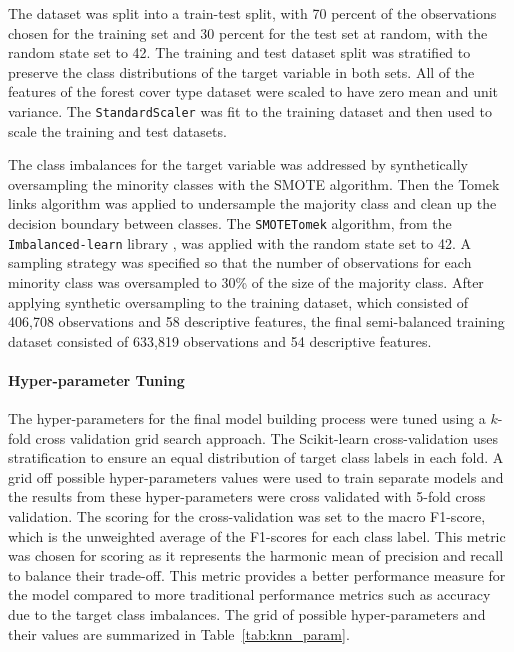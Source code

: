 \documentclass[conference]{IEEEtran}
\begin{document}
	The dataset was split into a train-test split, with 70 percent of the observations chosen for the training set and 30 percent for the test set at random, with the random state set to 42. The training and test dataset split was stratified to preserve the class distributions of the target variable in both sets. All of the features of the forest cover type dataset were scaled to have zero mean and unit variance. The \texttt{StandardScaler} was fit to the training dataset and then used to scale the training and test datasets. 
	
	The class imbalances for the target variable was addressed by synthetically oversampling the minority classes with the SMOTE algorithm. Then the Tomek links algorithm was applied to undersample the majority class and clean up the decision boundary between classes. The \texttt{SMOTETomek} algorithm, from the \texttt{Imbalanced-learn} library \cite{b5}, was applied with the random state set to 42. A sampling strategy was specified so that the number of observations for each minority class was oversampled to 30\% of the size of the majority class. After applying synthetic oversampling to the training dataset, which consisted of 406,708 observations and 58 descriptive features, the final semi-balanced training dataset consisted of 633,819 observations and 54 descriptive features.
	
	\paragraph{Hyper-parameter Tuning}
	The hyper-parameters for the final model building process were tuned using a $k$-fold cross validation grid search approach. The Scikit-learn cross-validation uses stratification to ensure an equal distribution of target class labels in each fold. A grid off possible hyper-parameters values were used to train separate models and the results from these hyper-parameters were cross validated with 5-fold cross validation. The scoring for the cross-validation was set to the macro F1-score, which is the unweighted average of the F1-scores for each class label. This metric was chosen for scoring as it represents the harmonic mean of precision and recall to balance their trade-off. This metric provides a better performance measure for the model compared to more traditional performance metrics such as accuracy due to the target class imbalances. The grid of possible hyper-parameters and their values are summarized in Table~\ref{tab:knn_param}.
	
\end{document}
